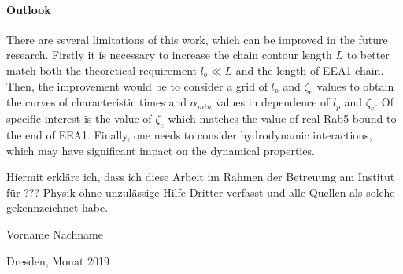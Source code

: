 \documentclass[
    paper=A4,pagesize=automedia,fontsize=12pt,
    BCOR=15mm,DIV=22,
    twoside,headinclude,footinclude=false,
    fleqn,             %
    bibliography=totocnumbered,          %
    listof=totoc,                %
    listof=flat,                 %
    cleardoublepage=empty      %
    numbers=endperiod
]{scrartcl}
\begin{document}
\paragraph{Outlook}
There are several limitations of this work, which can be improved in the future research.
Firstly it is necessary to increase the chain contour length $L$ to better match both the
theoretical requirement $l_b \ll L$ and the length of EEA1 chain. Then, the improvement 
would be to consider a grid of $l_p$ and $\zeta_e$ values to obtain the 
curves of characteristic times and $\alpha_{min}$ values in dependence of 
$l_p$ and $\zeta_e$. Of specific interest is the value of $\zeta_e$ which matches 
the value of real Rab5 bound to the end of EEA1. Finally, one needs to
consider hydrodynamic interactions, which may have significant impact on the dynamical
properties.  


\clearpage
\thispagestyle{empty}
\vspace*{1.5em}

Hiermit erkläre ich, dass ich diese Arbeit im Rahmen der Betreuung am Institut
für ??? Physik ohne unzulässige Hilfe Dritter verfasst und alle Quellen als solche gekennzeichnet habe.

\vspace*{45em}

Vorname Nachname \par
Dresden, Monat 2019



\end{document}
